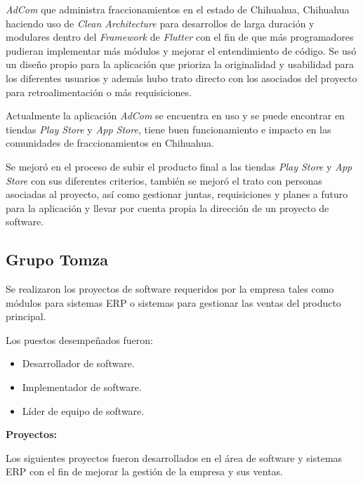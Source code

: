 \documentclass[protocolo.tex]{subfiles}
\begin{document}
\begin{enumerate}
\textit{AdCom} que administra fraccionamientos en el estado de Chihuahua,
Chihuahua haciendo uso de \textit{Clean Architecture} para desarrollos de larga duración y modulares
dentro del \textit{Framework} de \textit{Flutter} con el fin de que más programadores pudieran
implementar más módulos y mejorar el entendimiento de código. Se usó un diseño propio
para la aplicación que prioriza la originalidad y usabilidad para los diferentes usuarios y además hubo
trato directo con los asociados del proyecto para retroalimentación o más requisiciones.


Actualmente la aplicación \textit{AdCom} se encuentra en uso y se puede encontrar en tiendas \textit{Play
Store} y \textit{App Store}, tiene buen funcionamiento e impacto en las comunidades de
fraccionamientos en Chihuahua.

Se mejoró en el proceso de subir el producto final a las tiendas \textit{Play Store} y \textit{App Store} con
sus diferentes criterios, también se mejoró el trato con personas asociadas al proyecto, así como
gestionar juntas, requisiciones y planes a futuro para la aplicación y llevar por cuenta propia la dirección de un proyecto de software.

\end{enumerate}


\subsection{Grupo Tomza}

Se realizaron los proyectos de software requeridos por la empresa tales como módulos para
sistemas ERP o sistemas para gestionar las ventas del producto principal.\vspace{5mm}

Los puestos desempeñados fueron:

\begin{itemize}
\item Desarrollador de software.
\item Implementador de software.
\item Líder de equipo de software.
\end{itemize}

\textbf{Proyectos:}

Los siguientes proyectos fueron desarrollados en el área de software y sistemas ERP con el fin de
mejorar la gestión de la empresa y sus ventas.
\end{document}
